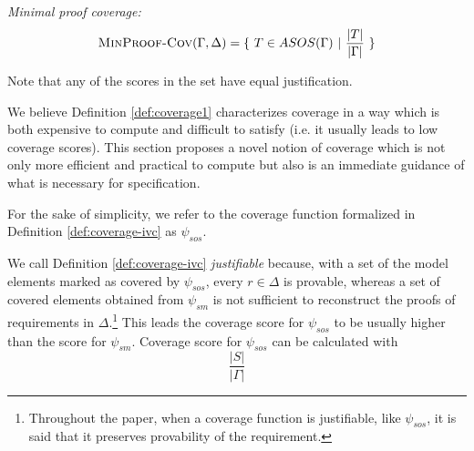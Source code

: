 \begin{definition} {\emph{Minimal proof coverage:}} \\
  \label{def:coverage-ivc}
\[
   \text{\sc MinProof-Cov}(\Gamma, \Delta) = \{~T \in ASOS(\Gamma)~|~\frac{ | T |}{|\Gamma|}~\}
\]
\end{definition}

\noindent Note that any of the scores in the set have equal justification.  


\iffalse
  Given $R = \bigwedge_{i} {r_i \in \Delta}$ and $S \in ASOS(R)$, justifiable coverage is formalized with function $\psi$ such that  $\forall \varphi \in S$. $\psi (R) \preccurlyeq \varphi$
  and $\forall \lambda \notin S$. $\psi (R) \nprec \lambda$.
\end{definition}
\vspace{2mm}


\[
   Sc_{\vdash 1}(\Gamma, \Delta) = \{~T \in ASOS(\Gamma)~|~\frac{ | T |}{|\Gamma|}~\}
\]

\fi



We believe Definition \ref{def:coverage1} characterizes coverage in a way which is both expensive to compute and difficult to satisfy (i.e. it usually leads to low coverage scores). This section proposes a novel notion of coverage which is not only more efficient and practical to compute but also  is an immediate guidance of what is necessary for specification.




For the sake of simplicity, we refer to the coverage function
formalized in Definition \ref{def:coverage-ivc} as $\psi_{sos}$.

We call Definition \ref{def:coverage-ivc} \emph{justifiable} because, with a set of the model elements marked as covered by $\psi_{sos}$, every $r \in \Delta$ is provable, whereas a set of covered elements obtained from $\psi_{sm}$ is not sufficient to reconstruct the proofs of requirements in $\Delta$.\footnote{Throughout the paper, when a coverage function is justifiable, like $\psi_{sos}$, it is said that it preserves provability of the requirement.}
This leads the coverage score for $\psi_{sos}$ to be usually higher than the score for $\psi_{sm}$. Coverage score for $\psi_{sos}$ can be calculated with $$\frac{|S|}{|\Gamma|}$$

